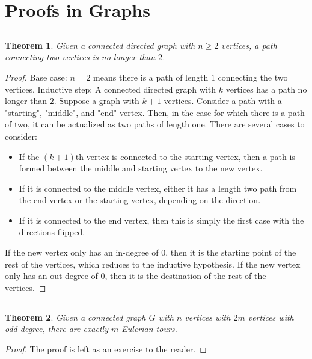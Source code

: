 \documentclass{article}
\newtheorem{theorem}{Theorem}
\begin{document}
\section{Proofs in Graphs}

\subsection{}

\begin{theorem}
    Given a connected directed graph with \(n \geqslant 2\) vertices, a path connecting two vertices is no longer than \(2\).
\end{theorem}
\begin{proof}
    Base case: \(n = 2\) means there is a path of length \(1\) connecting the two vertices.
    Inductive step: A connected directed graph with \(k\) vertices has a path no longer than \(2\).
    Suppose a graph with \(k + 1\) vertices.
    Consider a path with a "starting", "middle", and "end" vertex.
    Then, in the case for which there is a path of two, it can be actualized as two paths of length one.
    There are several cases to consider:
    \begin{itemize}
        \item If the \((k + 1)\)th vertex is connected to the starting vertex, then a path is formed between the middle and starting vertex to the new vertex.
        \item If it is connected to the middle vertex, either it has a length two path from the end vertex or the starting vertex, depending on the direction.
        \item If it is connected to the end vertex, then this is simply the first case with the directions flipped.
    \end{itemize}
    If the new vertex only has an in-degree of \(0\), then it is the starting point of the rest of the vertices, which reduces to the inductive hypothesis.
    If the new vertex only has an out-degree of \(0\), then it is the destination of the rest of the vertices.
\end{proof}

\subsection{}

\begin{theorem}
    Given a connected graph \(G\) with \(n\) vertices with \(2m\) vertices with odd degree, there are exactly \(m\) Eulerian tours.
\end{theorem}
\begin{proof}
    The proof is left as an exercise to the reader.
\end{proof}
\end{document}
